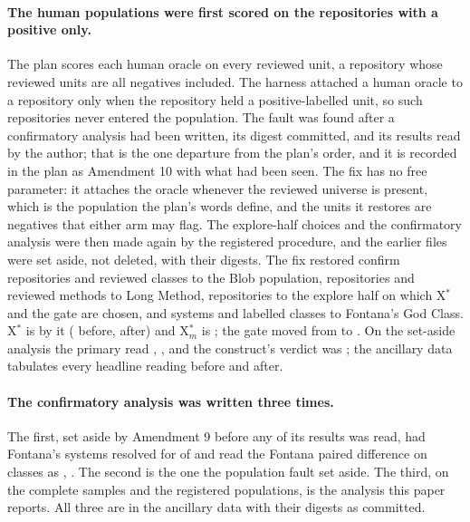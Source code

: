\documentclass[11pt,a4paper]{article}
\newcommand{\sig}[1]{\texttt{#1}}
\newcommand{\Xs}{X$^*$}
\newcommand{\Xm}{X$^*_m$}
\begin{document}
\paragraph{The human populations were first scored on the repositories
with a positive only.} The plan scores each human oracle on every reviewed
unit, a repository whose reviewed units are all negatives included. The
harness attached a human oracle to a repository only when the repository
held a positive-labelled unit, so such repositories never entered the
population. The fault was found after a confirmatory analysis had been
written, its digest committed, and its results read by the author; that
is the one departure from the plan's
order, and it is recorded in the plan as Amendment 10 with what had been
seen. The fix has no free parameter: it attaches the oracle whenever the
reviewed universe is present, which is the population the plan's words
define, and the units it restores are negatives that either arm may flag.
The explore-half choices and the confirmatory analysis were then made
again by the registered procedure, and the earlier files were set aside,
not deleted, with their digests. The fix restored \restoredBlobRepos{}
confirm repositories and \restoredBlobUnits{} reviewed classes to the Blob
population, \restoredLongRepos{} repositories and \restoredLongUnits{}
reviewed methods to Long Method, \restoredExploreBlobRepos{} repositories
to the explore half on which \Xs{} and the gate are chosen, and
\restoredFontanaSystems{} systems and \restoredFontanaUnits{} labelled
classes to Fontana's God Class. \Xs{} is \xClassChanged{} by it
(\sig{\priorXClass} before, \sig{\xClass} after) and \Xm{} is
\xMethodChanged{}; the gate moved from \priorGateRequiredExplore{} to
\gateRequired{}. On the set-aside analysis the primary read
\priorPrimMicro{}, \priorPrimVerdict{}, and the construct's verdict was
\priorConsVerdict{}; the ancillary data tabulates every headline reading
before and after.

\paragraph{The confirmatory analysis was written three times.} The first,
set aside by Amendment 9 before any of its results was read, had Fontana's
systems resolved for \fontanaVOneSystems{} of \fontanaSystems{} and read
the Fontana paired difference on \fontanaVOneUniv{} classes as
\fontanaVOneMicro{}, \fontanaVOneReading{}. The second is the one the
population fault set aside. The third, on the complete samples and the
registered populations, is the analysis this paper reports. All three are
in the ancillary data with their digests as committed.
\end{document}
